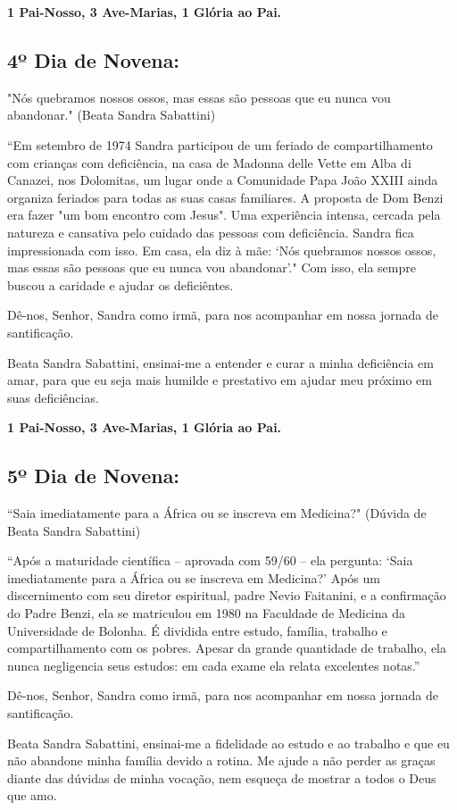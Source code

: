 \documentclass[a4paper,14pt]{extarticle} \usepackage[utf8]{inputenc}
\begin{document}
\textbf{1 Pai-Nosso, 3 Ave-Marias,  1 Glória ao Pai.}


\subsection{4º Dia de Novena:} "Nós quebramos nossos ossos, mas essas são pessoas que eu nunca vou abandonar." (Beata Sandra Sabattini)

“Em setembro de 1974 Sandra participou de um feriado de compartilhamento com crianças com deficiência, na casa de Madonna delle Vette em Alba di Canazei, nos Dolomitas, um lugar onde a Comunidade Papa João XXIII ainda organiza feriados para todas as suas casas familiares. A proposta de Dom Benzi era fazer "um bom encontro com Jesus". Uma experiência intensa, cercada pela natureza e cansativa pelo cuidado das pessoas com deficiência. Sandra fica impressionada com isso. Em casa, ela diz à mãe: ‘Nós quebramos nossos ossos, mas essas são pessoas que eu nunca vou abandonar’." Com isso, ela sempre buscou a caridade e ajudar os deficiêntes.


Dê-nos, Senhor, Sandra como irmã, para nos acompanhar em nossa jornada de santificação.


Beata Sandra Sabattini, ensinai-me a entender e curar a minha deficiência em amar, para que eu seja mais humilde e prestativo em ajudar meu próximo em suas deficiências.


\textbf{1 Pai-Nosso, 3 Ave-Marias,  1 Glória ao Pai.}


\subsection{5º Dia de Novena:} “Saia imediatamente para a África ou se inscreva em Medicina?" (Dúvida de Beata Sandra Sabattini)

“Após a maturidade científica – aprovada com 59/60 – ela pergunta: ‘Saia imediatamente para a África ou se inscreva em Medicina?’ Após um discernimento com seu diretor espiritual, padre Nevio Faitanini, e a confirmação do Padre Benzi, ela se matriculou em 1980 na Faculdade de Medicina da Universidade de Bolonha. É dividida entre estudo, família, trabalho e compartilhamento com os pobres. Apesar da grande quantidade de trabalho, ela nunca negligencia seus estudos: em cada exame ela relata excelentes notas.”


Dê-nos, Senhor, Sandra como irmã, para nos acompanhar em nossa jornada de santificação.


Beata Sandra Sabattini, ensinai-me a fidelidade ao estudo e ao trabalho e que eu não abandone minha família devido a rotina. Me ajude a não perder as graças diante das dúvidas de minha vocação, nem esqueça de mostrar a todos o Deus que amo.
\end{document}
